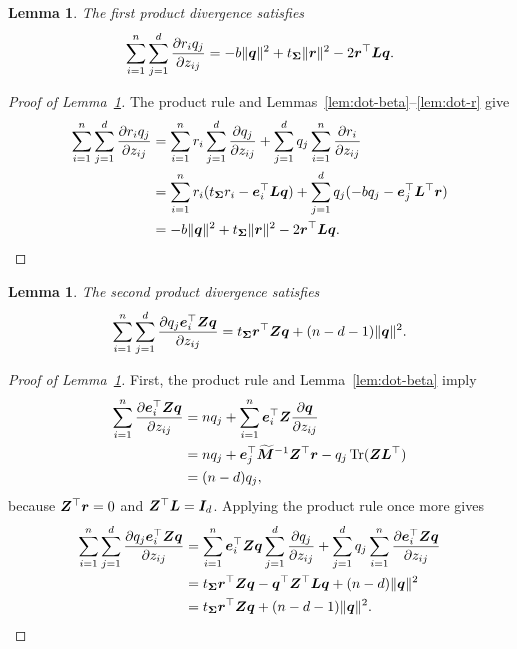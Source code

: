 \documentclass{article}
\theoremstyle{plain} %
\newtheorem{lemma}[theorem]{Lemma}
\theoremstyle{definition} %
\theoremstyle{definition} %
\begin{document}
\begin{lemma}\label{lem:dot-rh}
The first product divergence satisfies
\begin{align*}
    \sum_{i=1}^n\sum_{j=1}^d\pdv{r_iq_j}{z_{ij}}
    =-b\lVert\boldsymbol{q}\rVert^2+t_{\boldsymbol{\Sigma}}\lVert\boldsymbol{r}\rVert^2
      -2\boldsymbol{r}^\top\boldsymbol{L}\boldsymbol{q}.
\end{align*}
\end{lemma}

\begin{proof}[Proof of Lemma~\ref{lem:dot-rh}]
The product rule and Lemmas~\ref{lem:dot-beta}--\ref{lem:dot-r} give
\begin{align*}
    \sum_{i=1}^n\sum_{j=1}^d\pdv{r_iq_j}{z_{ij}}
    &=\sum_{i=1}^n r_i\sum_{j=1}^d\pdv{q_j}{z_{ij}}
       +\sum_{j=1}^d q_j\sum_{i=1}^n\pdv{r_i}{z_{ij}}\\
    &=\sum_{i=1}^n r_i(t_{\boldsymbol{\Sigma}}r_i-\boldsymbol{e}_i^\top\boldsymbol{L}\boldsymbol{q})
       +\sum_{j=1}^d q_j(-bq_j-\boldsymbol{e}_j^\top\boldsymbol{L}^\top\boldsymbol{r})\\
    &=-b\lVert\boldsymbol{q}\rVert^2+t_{\boldsymbol{\Sigma}}\lVert\boldsymbol{r}\rVert^2
       -2\boldsymbol{r}^\top\boldsymbol{L}\boldsymbol{q}.
\end{align*}
\end{proof}

\begin{lemma}\label{lem:dot-hxh}
The second product divergence satisfies
\begin{align*}
    \sum_{i=1}^n\sum_{j=1}^d
       \pdv{q_j\boldsymbol{e}_i^\top\boldsymbol{Z}\boldsymbol{q}}{z_{ij}}
    =t_{\boldsymbol{\Sigma}}\boldsymbol{r}^\top\boldsymbol{Z}\boldsymbol{q}+(n-d-1)\lVert\boldsymbol{q}\rVert^2.
\end{align*}
\end{lemma}

\begin{proof}[Proof of Lemma~\ref{lem:dot-hxh}]
First, the product rule and Lemma~\ref{lem:dot-beta} imply
\begin{align*}
    \sum_{i=1}^n\pdv{\boldsymbol{e}_i^\top\boldsymbol{Z}\boldsymbol{q}}{z_{ij}}
    &=nq_j+\sum_{i=1}^n\boldsymbol{e}_i^\top\boldsymbol{Z}\pdv{\boldsymbol{q}}{z_{ij}}\\
    &=nq_j+\boldsymbol{e}_j^\top\widetilde{\boldsymbol{M}}^{-1}\boldsymbol{Z}^\top\boldsymbol{r}
       -q_j\operatorname{Tr}(\boldsymbol{Z}\boldsymbol{L}^\top)\\
    &=(n-d)q_j,
\end{align*}
because $\boldsymbol{Z}^\top\boldsymbol{r}=0$ and $\boldsymbol{Z}^\top\boldsymbol{L}=\boldsymbol{I}_d$.
Applying the product rule once more gives
\begin{align*}
    \sum_{i=1}^n\sum_{j=1}^d
       \pdv{q_j\boldsymbol{e}_i^\top\boldsymbol{Z}\boldsymbol{q}}{z_{ij}}
    &=\sum_{i=1}^n\boldsymbol{e}_i^\top\boldsymbol{Z}\boldsymbol{q}
       \sum_{j=1}^d\pdv{q_j}{z_{ij}}
       +\sum_{j=1}^d q_j
          \sum_{i=1}^n\pdv{\boldsymbol{e}_i^\top\boldsymbol{Z}\boldsymbol{q}}{z_{ij}}\\
    &=t_{\boldsymbol{\Sigma}}\boldsymbol{r}^\top\boldsymbol{Z}\boldsymbol{q}
       -\boldsymbol{q}^\top\boldsymbol{Z}^\top\boldsymbol{L}\boldsymbol{q}+(n-d)\lVert\boldsymbol{q}\rVert^2\\
    &=t_{\boldsymbol{\Sigma}}\boldsymbol{r}^\top\boldsymbol{Z}\boldsymbol{q}+(n-d-1)\lVert\boldsymbol{q}\rVert^2.
\end{align*}
\end{proof}
\end{document}
